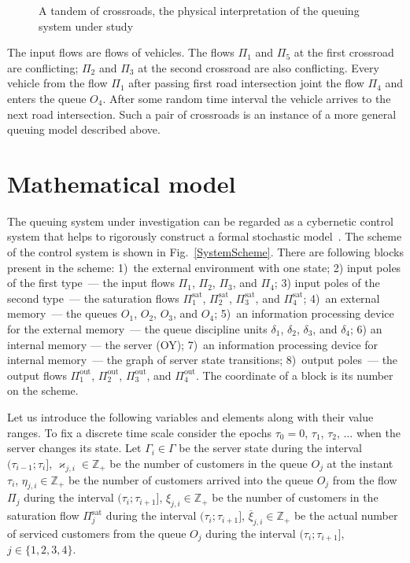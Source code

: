 \documentclass[60x84/16,10pt]{dccn}
\begin{document}
{\begin{figure}[h!]
    \caption {A tandem of crossroads, the physical interpretation of the queuing system under study}
    \label{crossroads}
\end{figure}
The input flows are flows of vehicles. The flows $\Pi_1$ and $\Pi_5$ at the first crossroad are
conflicting; $\Pi_2$ and $\Pi_3$ at the second crossroad are also conflicting. Every vehicle from
the flow $\Pi_1$ after passing first road intersection joint the flow $\Pi_4$ and enters the queue
$O_4$. After some random time interval the vehicle arrives to the next road intersection. Such a pair
of crossroads is an instance of a more general queuing model described above.

\section{Mathematical model}
The queuing system under investigation can be regarded as a cybernetic control system that helps to
rigorously construct a formal stochastic model~\cite{z:2012}. The scheme of the control system is
shown in Fig.~\ref{SystemScheme}. There are following blocks present in the scheme: 1)~the external
environment with one state; 2) input poles of the first type~--- the input flows $\Pi_1$, $\Pi_2$,
$\Pi_3$, and $\Pi_4$; 3) input poles of the second type~--- the saturation flows
$\Pi^{\mathrm{\text{sat}}}_1$, $\Pi^{\mathrm{\text{sat}}}_2$, $\Pi^{\mathrm{\text{sat}}}_3$, and
$\Pi^{\mathrm{\text{sat}}}_4$; 4)~an external memory~--- the queues $O_1$, $O_2$, $O_3$, and $O_4$;
5)~an information processing device for the external memory~--- the queue discipline units
$\delta_1$, $\delta_2$, $\delta_3$, and $\delta_4$; 6) an internal memory --- the server (OY); 7)~an
information processing device for internal memory~--- the graph of server state transitions;
8)~output poles~--- the output flows $\Pi^{\mathrm{\text{out}}}_1$, $\Pi^{\mathrm{\text{out}}}_2$,
$\Pi^{\mathrm{\text{out}}}_3$, and $\Pi^{\mathrm{\text{out}}}_4$.  The coordinate of a block is
its number on the scheme.

Let us  introduce the following variables and elements along with their
value ranges. To fix a discrete time scale consider the epochs $\tau_0=0$, $\tau_1$, $\tau_2$,
$\ldots$ when the server changes its state. Let $\Gamma_i\in\Gamma$ be the server state
during the interval $(\tau_{i-1};\tau_i]$, $\varkappa_{j,i} \in \mathbb{Z}_+ $ be the number of customers in
the queue $O_j$ at the instant $\tau_i$, $\eta_{j,i} \in \mathbb{Z}_+$ be the number of customers
arrived into the queue $O_j$ from the flow $\Pi_j$ during the interval $(\tau_{i};\tau_{i+1}]$, $\xi_{j,i} \in
\mathbb{Z}_+$ be the number of customers in the saturation flow $\Pi^{\mathrm{\text{sat}}}_j$ during
the interval $(\tau_{i};\tau_{i+1}]$, $\overline{\xi}_{j,i}\in \mathbb{Z}_+$ be the actual number of 
serviced customers from the queue  $O_j$ during the interval $(\tau_{i};\tau_{i+1}]$, $j\in
\{1,2,3,4\}$.

}
\end{document}
